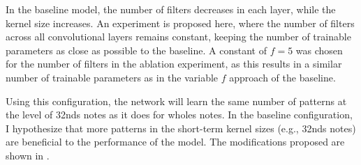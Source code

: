 
In the baseline model, the number of filters decreases in
each layer, while the kernel size increases. An experiment
is proposed here, where the number of filters across all
convolutional layers remains constant, keeping the number of
trainable parameters as close as possible to the baseline. A
constant of $f=5$ was chosen for the number of filters in
the ablation experiment, as this results in a similar number
of trainable parameters as in the variable $f$ approach of
the baseline.

Using this configuration, the network will learn the same
number of patterns at the level of \glspl{32nd} notes as it
does for \glspl{whole} notes. In the baseline configuration, I
hypothesize that more patterns in the short-term kernel
sizes (e.g., \glspl{32nd} notes) are beneficial to the
performance of the model. The modifications proposed are
shown in .

